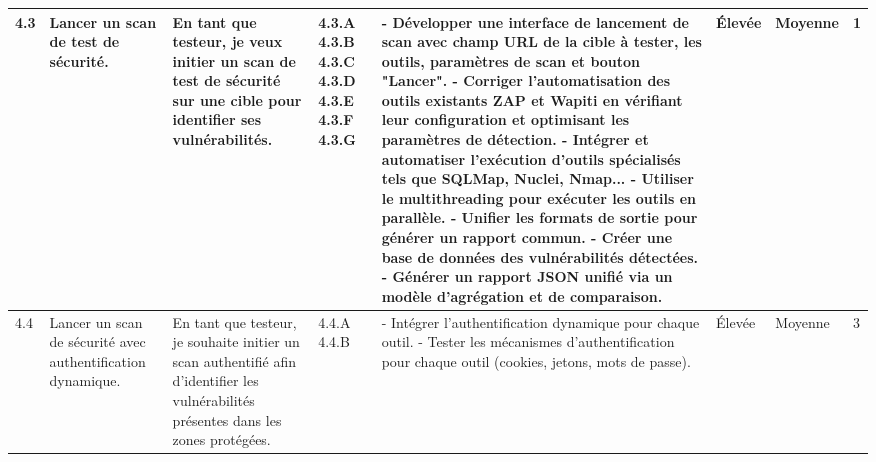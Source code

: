 \begin{landscape}
\begin{spacing}{0.94}
\begin{longtable}{|p{0.6cm}|p{2.6cm}|p{4.9cm}|p{0.97cm}|p{8.6cm}|p{0.35cm}|p{0.35cm}|p{1.6cm}|}
            4.3 & Lancer un scan de test de sécurité. & En tant que testeur, je veux initier un scan de test de sécurité sur une cible pour identifier ses vulnérabilités. 
            & 
            4.3.A \newline\vspace{1cm} 
            4.3.B\newline\vspace{0.9cm} 
            4.3.C\newline\vspace{0.5cm} 
            4.3.D\newline\vspace{0.5cm} 
            4.3.E\newline\vspace{0.5cm} 
            4.3.F\newline\vspace{0.5cm} 
            4.3.G&
            - Développer une interface de lancement de scan avec champ URL de la cible à tester, les outils, paramètres de scan et bouton "Lancer".\newline
            - Corriger l'automatisation des outils existants \textbf{ZAP} et \textbf{Wapiti} en vérifiant leur configuration et optimisant les paramètres de détection.\newline
            - Intégrer et automatiser l’exécution d’outils spécialisés tels que SQLMap, Nuclei, Nmap...\newline
            - Utiliser le multithreading pour exécuter les outils en parallèle.\newline
            - Unifier les formats de sortie pour générer un rapport commun.\newline
            - Créer une base de données des vulnérabilités détectées.\newline
            - Générer un rapport JSON unifié via un modèle d’agrégation et de comparaison.
            & Élevée & Moyenne & 1 \\ \hline
            
            4.4 & Lancer un scan de sécurité avec authentification dynamique. 
                & En tant que testeur, je souhaite initier un scan authentifié afin d’identifier les vulnérabilités présentes dans les zones protégées.  & 4.4.A \newline\vspace{0.5cm} 4.4.B  & 
                - Intégrer l’authentification dynamique pour chaque outil. \newline
                - Tester les mécanismes d’authentification pour chaque outil (cookies, jetons, mots de passe). & Élevée & Moyenne &3 \\ \hline
            

\end{longtable}
\end{spacing}
\end{landscape}

